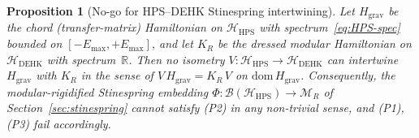 \documentclass[12pt,a4paper]{article}
\newtheorem{proposition}{Proposition}
\theoremstyle{definition}
\begin{document}
\begin{proposition}[No-go for HPS--DEHK Stinespring intertwining]
\label{prop:no-go-spectrum}
Let $H_{\mathrm{grav}}$ be the chord (transfer-matrix) Hamiltonian on
$\mathcal{H}_{\mathrm{HPS}}$ with spectrum~\eqref{eq:HPS-spec} bounded on
$[-E_{\max},+E_{\max}]$, and let $K_R$ be the dressed modular Hamiltonian
on $\mathcal{H}_{\mathrm{DEHK}}$ with spectrum~$\mathbb{R}$. Then no
isometry $V:\mathcal{H}_{\mathrm{HPS}}\to\mathcal{H}_{\mathrm{DEHK}}$ can
intertwine $H_{\mathrm{grav}}$ with $K_R$ in the sense of
$V\,H_{\mathrm{grav}} = K_R\,V$ on $\mathrm{dom}\,H_{\mathrm{grav}}$.
Consequently, the modular-rigidified Stinespring embedding
$\Phi:\mathcal{B}(\mathcal{H}_{\mathrm{HPS}})\to\mathcal{M}_R$ of
Section~\ref{sec:stinespring} cannot satisfy (P2) in any non-trivial sense,
and (P1), (P3) fail accordingly.
\end{proposition}
\end{document}
